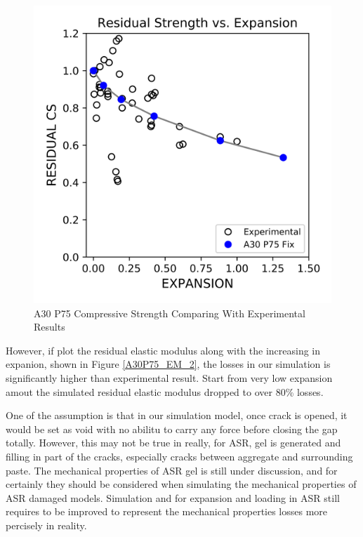 \begin{figure}[ht!]
\centering
\includegraphics[width=.8\linewidth]{Files/CS_plot/ASRCS1.png}
  \caption{A30 P75 Compressive Strength Comparing With Experimental Results}
  \label{A30P7sss5_CS_2}
\end{figure}



However, if plot the residual elastic modulus along with the increasing in expanion, shown in Figure \ref{A30P75_EM_2}, the losses in our simulation is significantly higher than experimental result. Start from very low expansion amout the simulated residual elastic modulus dropped to over 80\% losses.

One of the assumption is that in our simulation model, once crack is opened, it would be set as void with no abilitu to carry any force before closing the gap totally. However, this may not be true in really, for ASR, gel is generated and filling in part of the cracks, especially cracks between aggregate and surrounding paste. The mechanical properties of ASR gel is still under discussion, and for certainly they should be considered when simulating the mechanical properties of ASR damaged models. Simulation and for expansion and loading in ASR still requires to be improved to represent the mechanical properties losses more percisely in reality.



